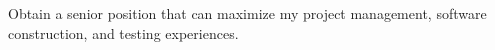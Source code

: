 Obtain a senior position
that can maximize my project management,
     software construction,
     and testing experiences.
